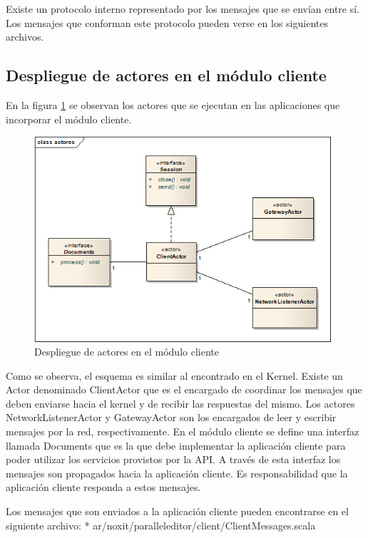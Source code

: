 \documentclass[12pt,a4paper]{article}
\begin{document}
Existe un protocolo interno representado por los mensajes que se envían entre sí. Los mensajes que conforman este protocolo
pueden verse en los siguientes archivos.

\subsection{Despliegue de actores en el módulo cliente}
En la figura \ref{actores-cliente} se observan los actores que se ejecutan en las aplicaciones que incorporar el módulo cliente.

	\begin{figure}[!ht]
		\begin{center}
			\includegraphics[width=11cm]{actores-cliente.png}
			\caption{\label{actores-cliente} Despliegue de actores en el módulo cliente }
		\end{center}
	\end{figure}

Como se observa, el esquema es similar al encontrado en el Kernel. Existe un Actor denominado ClientActor que es el
encargado de coordinar los mensajes que deben enviarse hacia el kernel y de recibir las respuestas del mismo.
Los actores NetworkListenerActor y GatewayActor son los encargados de leer y escribir mensajes por la red, respectivamente.
En el módulo cliente se define una interfaz llamada Documents que es la que debe implementar la aplicación cliente para poder
utilizar los servicios provistos por la API.
A través de esta interfaz los mensajes son propagados hacia la aplicación cliente. Es responsabilidad que la aplicación cliente
responda a estos mensajes.

Los mensajes que son enviados a la aplicación cliente pueden encontrarse en el siguiente archivo:
* ar/noxit/paralleleditor/client/ClientMessages.scala
\end{document}
